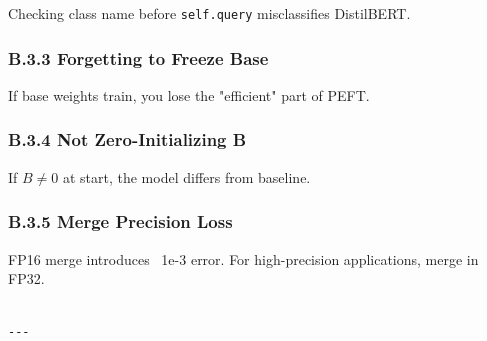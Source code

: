 Checking class name before \texttt{self.query} misclassifies DistilBERT.

\subsubsection{B.3.3 Forgetting to Freeze Base}

If base weights train, you lose the "efficient" part of PEFT.

\subsubsection{B.3.4 Not Zero-Initializing B}

If $B \neq 0$ at start, the model differs from baseline.

\subsubsection{B.3.5 Merge Precision Loss}

FP16 merge introduces ~1e-3 error. For high-precision applications, merge 
in FP32.
\begin{lstlisting}

---
\end{lstlisting}